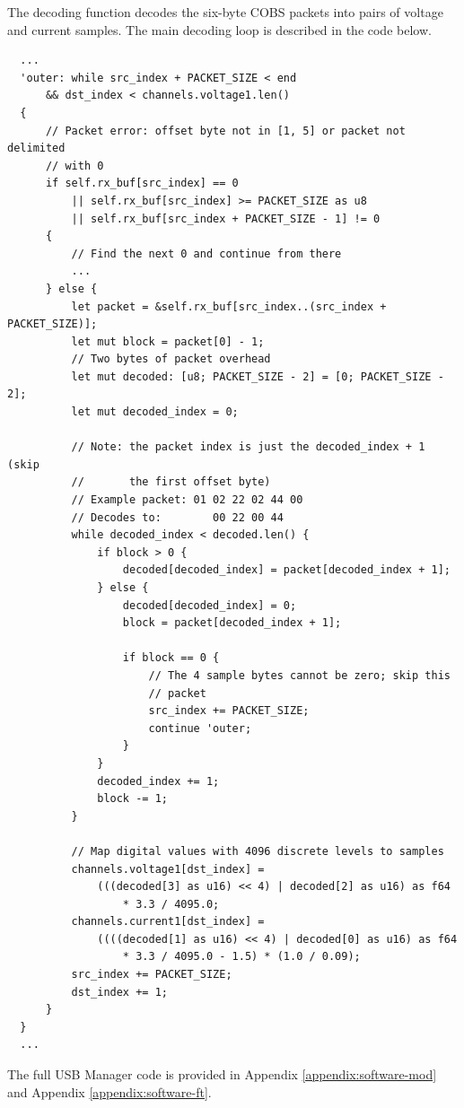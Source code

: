 \documentclass[letterpaper,11pt]{article}
\begin{document}
The decoding function decodes the six-byte COBS packets into pairs of voltage
and current samples. The main decoding loop is described in the code below.

\begin{verbatim}
  ...
  'outer: while src_index + PACKET_SIZE < end
      && dst_index < channels.voltage1.len()
  {
      // Packet error: offset byte not in [1, 5] or packet not delimited
      // with 0
      if self.rx_buf[src_index] == 0
          || self.rx_buf[src_index] >= PACKET_SIZE as u8
          || self.rx_buf[src_index + PACKET_SIZE - 1] != 0
      {
          // Find the next 0 and continue from there
          ...
      } else {
          let packet = &self.rx_buf[src_index..(src_index + PACKET_SIZE)];
          let mut block = packet[0] - 1;
          // Two bytes of packet overhead
          let mut decoded: [u8; PACKET_SIZE - 2] = [0; PACKET_SIZE - 2];
          let mut decoded_index = 0;

          // Note: the packet index is just the decoded_index + 1 (skip
          //       the first offset byte)
          // Example packet: 01 02 22 02 44 00
          // Decodes to:        00 22 00 44
          while decoded_index < decoded.len() {
              if block > 0 {
                  decoded[decoded_index] = packet[decoded_index + 1];
              } else {
                  decoded[decoded_index] = 0;
                  block = packet[decoded_index + 1];

                  if block == 0 {
                      // The 4 sample bytes cannot be zero; skip this
                      // packet
                      src_index += PACKET_SIZE;
                      continue 'outer;
                  }
              }
              decoded_index += 1;
              block -= 1;
          }

          // Map digital values with 4096 discrete levels to samples
          channels.voltage1[dst_index] =
              (((decoded[3] as u16) << 4) | decoded[2] as u16) as f64
                  * 3.3 / 4095.0;
          channels.current1[dst_index] =
              ((((decoded[1] as u16) << 4) | decoded[0] as u16) as f64
                  * 3.3 / 4095.0 - 1.5) * (1.0 / 0.09);
          src_index += PACKET_SIZE;
          dst_index += 1;
      }
  }
  ...
\end{verbatim}

The full USB Manager code is provided in Appendix \ref{appendix:software-mod} and
Appendix \ref{appendix:software-ft}.
\end{document}
